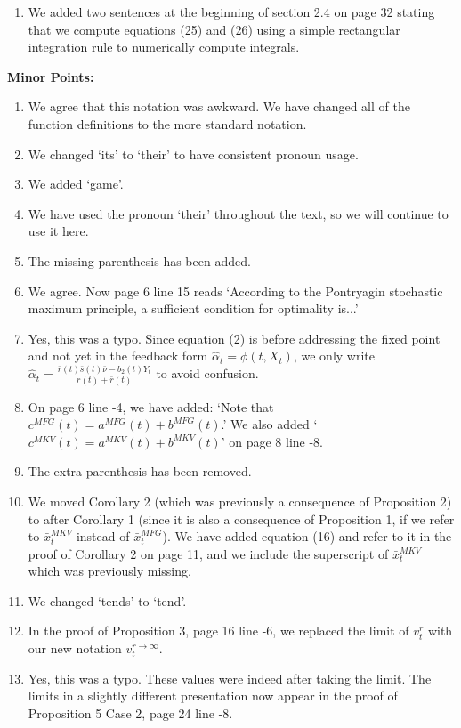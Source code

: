 \documentclass[11pt]{article}
\begin{document}
\begin{enumerate}
	\item We added two sentences at the beginning of section 2.4 on page 32 stating that we compute equations (25) and (26) using a simple rectangular integration rule to numerically compute integrals.
\end{enumerate}

\hspace{-7mm} \textbf{Minor Points:}
\begin{enumerate}
	\item We agree that this notation was awkward. We have changed all of the function definitions to the more standard notation.
	\item We changed `its' to `their' to have consistent pronoun usage.
	\item We added `game'.
	\item We have used the pronoun `their' throughout the text, so we will continue to use it here.
	\item The missing parenthesis has been added.
	\item We agree. Now page 6 line 15 reads `According to the Pontryagin stochastic maximum principle, a sufficient condition for optimality is...'
	\item Yes, this was a typo. Since equation (2) is before addressing the fixed point and not yet in the feedback form $\hat{\alpha}_t=\phi(t,X_t)$, we only write $\hat{\alpha}_t=\frac{\bar{r}(t)\bar{s}(t)\bar{\nu}-b_2(t)Y_t}{r(t)+\bar{r}(t)}$ to avoid confusion.
	\item On page 6 line -4, we have added: `Note that $c^{MFG}(t)=a^{MFG}(t)+b^{MFG}(t)$.' We also added `$c^{MKV}(t)=a^{MKV}(t)+b^{MKV}(t)$' on page 8 line -8.
	\item The extra parenthesis has been removed.
	\item We moved Corollary 2 (which was previously a consequence of Proposition 2) to after Corollary 1 (since it is also a consequence of Proposition 1, if we refer to $\bar{x}_t^{MKV}$ instead of $\bar{x}_t^{MFG}$). We have added equation (16) and refer to it in the proof of Corollary 2 on page 11, and we include the superscript of $\bar{x}_t^{MKV}$ which was previously missing.
	\item We changed `tends' to `tend'.
	\item In the proof of Proposition 3, page 16 line -6, we replaced the limit of $v^r_t$ with our new notation $v^{r \to \infty}_t$.
	\item Yes, this was a typo. These values were indeed after taking the limit. The limits in a slightly different presentation now appear in the proof of Proposition 5 Case 2, page 24 line -8.
\end{enumerate}
\end{document}
